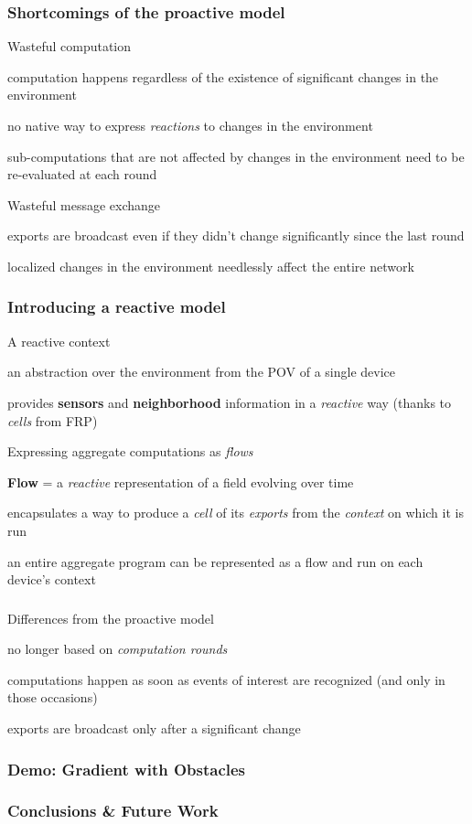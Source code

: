 \begin{frame}
    \frametitle{Shortcomings of the proactive model}
    \begin{blockitems}{Wasteful computation}
        \item computation happens regardless of the existence of significant changes in the environment
        \item no native way to express \textit{reactions} to changes in the environment
        \item sub-computations that are not affected by changes in the environment need to be re-evaluated at each round
    \end{blockitems}
    \begin{blockitems}{Wasteful message exchange}
        \item exports are broadcast even if they didn't change significantly since the last round
        \item localized changes in the environment needlessly affect the entire network
    \end{blockitems}
\end{frame}

\begin{frame}
    \frametitle{Introducing a reactive model}
    \begin{blockitems}{A reactive context}
        \item an abstraction over the environment from the POV of a single device
        \item provides \textbf{sensors} and \textbf{neighborhood} information in a \textit{reactive} way (thanks to \textit{cells} from FRP)
    \end{blockitems}
    \begin{blockitems}{Expressing aggregate computations as \textit{flows}}
        \item \textbf{Flow} = a \textit{reactive} representation of a field evolving over time
        \item encapsulates a way to produce a \textit{cell} of its \textit{exports} from the \textit{context} on which it is run
        \item an entire aggregate program can be represented as a flow and run on each device's context
    \end{blockitems}
\end{frame}

\begin{frame}
    \frametitle{}
    \begin{blockitems}{Differences from the proactive model}
        \item no longer based on \textit{computation rounds}
        \item computations happen as soon as events of interest are recognized (and only in those occasions)
        \item exports are broadcast only after a significant change
    \end{blockitems}

\end{frame}

\begin{frame}
    \frametitle{Demo: Gradient with Obstacles}
\end{frame}

\begin{frame}
    \frametitle{Conclusions \& Future Work}
\end{frame}
